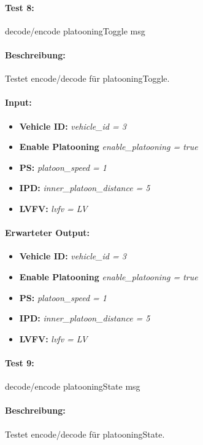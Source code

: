 \documentclass[a4paper, 12pt, titlepage]{scrartcl}
\begin{document}
{			\paragraph{Test 8:}{decode/encode platooningToggle msg}
			\paragraph{Beschreibung:} Testet encode/decode für platooningToggle.
			\paragraph{Input:}
			\begin{itemize} \itemsep-0.5em
				\item \textbf{Vehicle ID:} \emph{vehicle\_id = 3}
				\item \textbf{Enable Platooning} \emph{enable\_platooning = true}
				\item \textbf{PS:} \emph{platoon\_speed = 1}
				\item \textbf{IPD:} \emph{inner\_platoon\_distance = 5}
				\item \textbf{LVFV:} \emph{lvfv = LV}
			\end{itemize}
			\paragraph{Erwarteter Output:}
			\begin{itemize} \itemsep-0.5em
				\item \textbf{Vehicle ID:} \emph{vehicle\_id = 3}
				\item \textbf{Enable Platooning} \emph{enable\_platooning = true}
				\item \textbf{PS:} \emph{platoon\_speed = 1}
				\item \textbf{IPD:} \emph{inner\_platoon\_distance = 5}
				\item \textbf{LVFV:} \emph{lvfv = LV}
			\end{itemize}

			\paragraph{Test 9:}{decode/encode platooningState msg}
			\paragraph{Beschreibung:} Testet encode/decode für platooningState.
}
\end{document}
